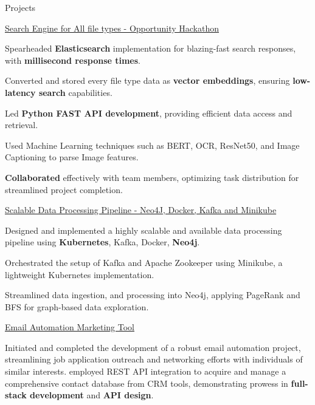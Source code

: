 \documentclass{resume} %
\begin{document}
\begin{rSection}{Projects}


\begin{rSubsection}{\href{https://github.com/2023-opportunity-hack/SouL--DigitalRecordsManagementforMuseumsandHistoricalSites}{Search Engine for All file types - Opportunity Hackathon }}{}{}{}
    \item Spearheaded \textbf{Elasticsearch} implementation for blazing-fast search responses, with \textbf{millisecond response times}.
    \item Converted and stored every file type data as \textbf{vector embeddings}, ensuring \textbf{low-latency search} capabilities.
    \item Led \textbf{Python FAST API development}, providing efficient data access and retrieval.
    \item Used Machine Learning techniques such as BERT, OCR, ResNet50, and Image Captioning to parse Image features.
    \item \textbf{Collaborated} effectively with team members, optimizing task distribution for streamlined project completion.
\end{rSubsection}


\begin{rSubsection}{\href{https://github.com/ameygoes/ASU_MCS/tree/master/SPRING_23_CLASSES_SEM_2/CSE_511_DATA_PROCESSING_AT_SCALE/PROJECTS}{Scalable Data Processing Pipeline - Neo4J, Docker, Kafka and Minikube}}{}{}{}
\item Designed and implemented a highly scalable and available data processing pipeline using \textbf{Kubernetes}, Kafka, Docker, \textbf{Neo4j}.
\item Orchestrated the setup of Kafka and Apache Zookeeper using Minikube, a lightweight Kubernetes implementation.
\item Streamlined data ingestion, and processing into Neo4j, applying PageRank and BFS for graph-based data exploration.
\end{rSubsection}


\begin{rSubsection}{\href{https://github.com/ameygoes/Automated_Email_HRs}{Email Automation Marketing Tool}}{}{}{}
\item Initiated and completed the development of a robust email automation project, streamlining job application outreach and networking efforts with individuals of similar interests.
\itemSkillfully employed REST API integration to acquire and manage a comprehensive contact database from CRM tools, demonstrating prowess in \textbf{full-stack development} and\textbf{ API design}.
\end{rSubsection}



\end{rSection}
\end{document}
